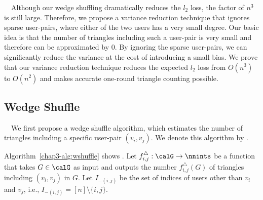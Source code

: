 \smallskip
{}~~Although our wedge shuffling dramatically reduces the $l_2$ loss, the factor of $n^3$ is still large. 
Therefore, we propose a variance reduction technique that ignores sparse user-pairs, where either of the two users has a very small degree. 
Our basic idea is that the number of triangles including such a user-pair is very small 
and therefore can be approximated by $0$. 
By ignoring the sparse user-pairs, we can significantly reduce the variance at the cost of introducing a small bias. 
We prove that our variance reduction technique reduces the expected $l_2$ loss from $O(n^3)$ to $O(n^2)$ and makes accurate one-round triangle counting possible. 

\subsection{Wedge Shuffle}
\label{chap3-sub:wedge}

{}~~We first 
propose a wedge shuffle algorithm, which estimates the number of triangles including a specific user-pair $(v_i,v_j)$. 
We denote this algorithm by \AlgWS{}. 

Algorithm~\ref{chap3-alg:wshuffle} shows \AlgWS{}. 
Let $f_{i,j}^\triangle: \calG \rightarrow \nnints$ be a function that takes $G \in \calG$ as input and outputs the number $f_{i,j}^\triangle(G)$ of triangles including $(v_i,v_j)$ in $G$. 
Let $I_{-(i,j)}$ be the set of indices of users other than $v_i$ and $v_j$, i.e., $I_{-(i,j)} = [n]\setminus\{i,j\}$. 

